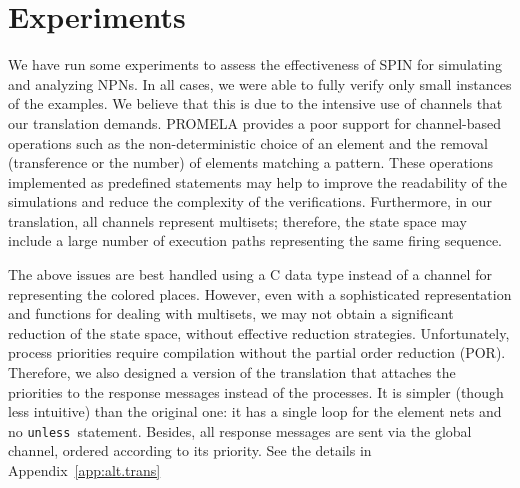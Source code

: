 \documentclass{llncs}
\begin{document}
\section{Experiments}
\label{sec:performance}

We have run some experiments to assess the effectiveness of SPIN for simulating and analyzing NPNs. In all cases, we were able to fully verify only small instances of the examples. We believe that this is due to the intensive use of channels that our translation demands. PROMELA provides a poor support for channel-based operations such as the non-deterministic choice of an element and the removal (transference or the number) of elements matching a pattern. These operations implemented as predefined statements may help to improve the readability of the simulations and reduce the complexity of the verifications. Furthermore, in our translation, all channels represent multisets; therefore, the state space may include a large number of execution paths representing the same firing sequence.

The above issues are best handled using a C data type instead of a channel for representing the colored places. However, even with a sophisticated representation and functions for dealing with multisets, we may not obtain a significant reduction of the state space, without effective reduction strategies. Unfortunately, process priorities require compilation without the partial order reduction (POR). Therefore, we also designed a version of the translation that attaches the priorities to the response messages instead of the processes. It is simpler (though less intuitive) than the original one: it has a single loop for the element nets and no \small\verb"unless"\nfont\  statement. Besides, all response messages are sent via the global channel, ordered according to its priority. See the  details in Appendix~\ref{app:alt.trans}
\end{document}
